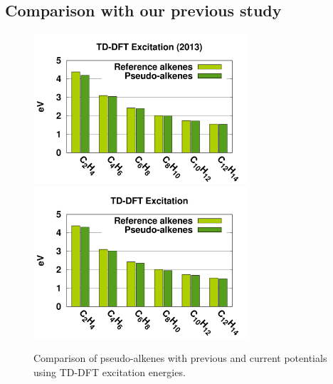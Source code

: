 \documentclass[aip]{revtex4-1}
\begin{document}
\subsection{Comparison with our previous study}
\begin{figure}
\begin{center}
\includegraphics[width=8cm]{short_pbe0_tddft_2013}
\includegraphics[width=8cm]{short_pbe0_tddft}
\end{center}
\caption{Comparison of pseudo-alkenes with previous\cite{drujon_pseudopotentials_2013} and current potentials using TD-DFT excitation energies.}
\label{fig:alkenes_tddft}
\end{figure}

\end{document}
